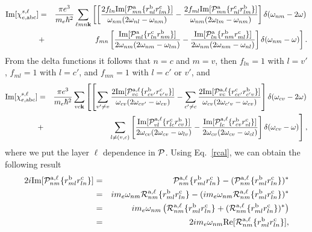 \documentclass[floatfix,prb,aps,superscriptaddress,11pt,preprint]{revtex4}
\begin{document}
\begin{eqnarray}\label{imchie2}
\mathrm{Im}[\chi_{e,\mathrm{a}\mathrm{b}\mathrm{c}}^{s,\ell}]
&=&
\frac{\pi e^3}{m_e\hbar^2} 
\sum_{\ell m n\mathbf{k}}
\left[
\left[
\frac{2 f_{ln}\mathrm{Im}[{\cal P}^{\mathrm{a}}_{mn}\{r^{\mathrm{b}}_{nl}r^{\mathrm{c}}_{lm}\}]
}{\omega_{nm}(2\omega_{nl}-\omega_{nm})}
-\frac{2 f_{ml}\mathrm{Im}[{\cal P}^{\mathrm{a}}_{mn}\{r^{\mathrm{c}}_{nl}r^{\mathrm{b}}_{lm}\}]}
{\omega_{nm}(2\omega_{lm}-\omega_{nm})}
\right]
\delta(\omega_{nm}-2\omega)
\right.
\nonumber\\
&+&
\left. 
f_{mn}
\left[
\frac{\mathrm{Im}[{\cal P}^{\mathrm{a}}_{ml}\{r^{\mathrm{c}}_{ln}r^{\mathrm{b}}_{nm}\}]}
{2\omega_{nm}(2\omega_{nm}-\omega_{lm})}
-
\frac{\mathrm{Im}[{\cal P}^{\mathrm{a}}_{ln}\{r^{\mathrm{b}}_{nm}r^{\mathrm{c}}_{ml}\}]}
{2\omega_{nm}(2\omega_{nm}-\omega_{nl})}
\right]
\delta(\omega_{nm}-\omega)
\right]
.
\end{eqnarray}  
From the delta functions it follows that $n=c$ and $m=v$, then
$f_{ln}=1$ with $l=v'$,
$f_{ml}=1$ with $l=c'$, 
and
$f_{mn}=1$ with $l=c'$ or $v'$, and
\begin{eqnarray}\label{imchie3}
\mathrm{Im}[\chi_{e,\mathrm{a}\mathrm{b}\mathrm{c}}^{s,\ell}]
&=&
\frac{\pi e^3}{m_e\hbar^2} 
\sum_{vc\mathbf{k}}
\left[
\left[
\sum_{v'\ne v}
\frac{2\mathrm{Im}[{\cal P}^{\mathrm{a},\ell}_{vc}\{r^{\mathrm{b}}_{cv'}r^{\mathrm{c}}_{v'v}\}]
}{\omega_{cv}(2\omega_{cv'}-\omega_{cv})}
-
\sum_{c'\ne c}
\frac{2\mathrm{Im}[{\cal P}^{\mathrm{a},\ell}_{vc}\{r^{\mathrm{c}}_{cc'}r^{\mathrm{b}}_{c'v}\}]}
{\omega_{cv}(2\omega_{c'v}-\omega_{cv})}
\right]
\delta(\omega_{cv}-2\omega)
\right.
\nonumber\\
&+&
\left.
\sum_{l\neq(v,c)}
\left[
\frac{\mathrm{Im}[{\cal P}^{\mathrm{a},\ell}_{vl}\{r^{\mathrm{c}}_{lc}r^{\mathrm{b}}_{cv}\}]}
{2\omega_{cv}(2\omega_{cv}-\omega_{lv})}
-
\frac{\mathrm{Im}[{\cal P}^{\mathrm{a},\ell}_{lc}\{r^{\mathrm{b}}_{cv}r^{\mathrm{c}}_{vl}\}]}
{2\omega_{cv}(2\omega_{cv}-\omega_{cl})}
\right]
\delta(\omega_{cv}-\omega)
\right]
,
\end{eqnarray}  
where we put the layer $\ell$ dependence in ${\cal P}$.
Using Eq.~\eqref{rcal}, we can obtain the following result
\begin{eqnarray}\label{ptor}
2i\mathrm{Im}[{\cal P}^{\mathrm{a},\ell}_{nm}\{r^{\mathrm{b}}_{ml}r^{\mathrm{c}}_{ln}\}]
&=&
{\cal P}^{\mathrm{a},\ell}_{nm}\{r^{\mathrm{b}}_{ml}r^{\mathrm{c}}_{ln}\}
-
({\cal P}^{\mathrm{a},\ell}_{nm}\{r^{\mathrm{b}}_{ml}r^{\mathrm{c}}_{ln}\})^*
\nonumber\\
&=&
im_e\omega_{nm}{\cal R}^{\mathrm{a},\ell}_{nm}\{r^{\mathrm{b}}_{ml}r^{\mathrm{c}}_{ln}\}
-
(im_e\omega_{nm}{\cal R}^{\mathrm{a},\ell}_{nm}\{r^{\mathrm{b}}_{ml}r^{\mathrm{c}}_{ln}\})^*
\nonumber\\
&=&
im_e\omega_{nm}\left({\cal R}^{\mathrm{a},\ell}_{nm}\{r^{\mathrm{b}}_{ml}r^{\mathrm{c}}_{ln}\}
+
({\cal R}^{\mathrm{a},\ell}_{nm}\{r^{\mathrm{b}}_{ml}r^{\mathrm{c}}_{ln}\})^*
\right)
\nonumber\\
&=&
2im_e\omega_{nm}\mathrm{Re}[{\cal R}^{\mathrm{a},\ell}_{nm}\{r^{\mathrm{b}}_{ml}r^{\mathrm{c}}_{ln}\}]
,
\end{eqnarray}
\end{document}
